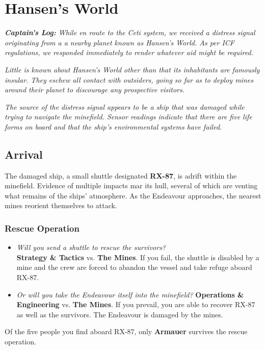 \documentclass[11pt, a5paper, parskip=half-, DIV=12]{scrartcl}
\begin{document}
\section*{Hansen's World}
\textit{\textbf{Captain's Log:} While en route to the Ceti system, we received a distress signal originating from a a nearby planet known as Hansen's World. As per ICF regulations, we responded immediately to render whatever aid might be required.}

\textit{Little is known about Hansen's World other than that its inhabitants are famously insular. They eschew all contact with outsiders, going so far as to deploy mines around their planet to discourage any prospective visitors.}

\textit{The source of the distress signal appears to be a ship that was damaged while trying to navigate the minefield. Sensor readings indicate that there are five life forms on board and that the ship's environmental systems have failed.}%

\subsection*{Arrival}
The damaged ship, a small shuttle designated \textbf{RX-87}, is adrift within the minefield. Evidence of multiple impacts mar its hull, several of which are venting what remains of the ships' atmosphere. As the Endeavour approaches, the nearest mines reorient themselves to attack.  

\subsubsection*{Rescue Operation}
\begin{itemize}
	\item \textit{Will you send a shuttle to rescue the survivors?} \\ \textbf{Strategy \& Tactics} vs. \textbf{The Mines}. If you fail, the shuttle is disabled by a mine and the crew are forced to abandon the vessel and take refuge aboard RX-87.
	\item \textit{Or will you take the Endeavour itself into the minefield?} \textbf{Operations \& Engineering} vs. \textbf{The Mines}. If you prevail, you are able to recover RX-87 as well as the survivors. The Endeavour is damaged by the mines.  
\end{itemize}

Of the five people you find aboard RX-87, only \textbf{Armauer} survives the rescue operation.
\end{document}
